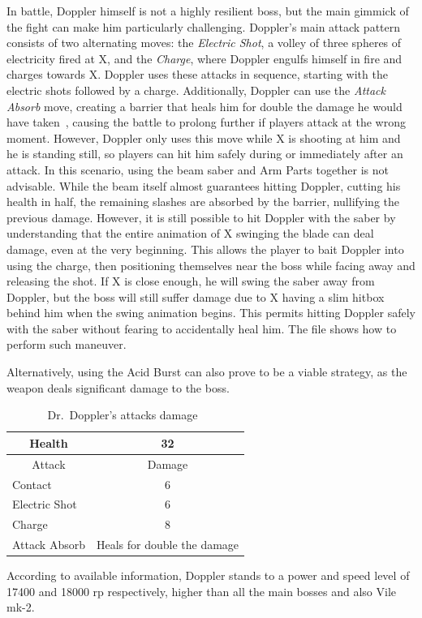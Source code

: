 In battle, Doppler himself is not a highly resilient boss, but the main gimmick of the fight can make him particularly challenging. Doppler's main attack pattern consists of two alternating moves: the \emph{Electric Shot}, a volley of three spheres of electricity fired at X, and the \emph{Charge}, where Doppler engulfs himself in fire and charges towards X. Doppler uses these attacks in sequence, starting with the electric shots followed by a charge. Additionally, Doppler can use the \emph{Attack Absorb} move, creating a barrier that heals him for double the damage he would have taken~\cite{wiki:X3_enemies}, causing the battle to prolong further if players attack at the wrong moment. However, Doppler only uses this move while X is shooting at him and he is standing still, so players can hit him safely during or immediately after an attack. In this scenario, using the beam saber and Arm Parts together is not advisable. While the beam itself almost guarantees hitting Doppler, cutting his health in half, the remaining slashes are absorbed by the barrier, nullifying the previous damage. However, it is still possible to hit Doppler with the saber by understanding that the entire animation of X swinging the blade can deal damage, even at the very beginning. This allows the player to bait Doppler into using the charge, then positioning themselves near the boss while facing away and releasing the shot. If X is close enough, he will swing the saber away from Doppler, but the boss will still suffer damage due to X having a slim hitbox behind him when the swing animation begins. This permits hitting Doppler safely with the saber without fearing to accidentally heal him. The file  shows how to perform such maneuver.

 Alternatively, using the Acid Burst can also prove to be a viable strategy, as the weapon deals significant damage to the boss.
\begin{table}[htp]
	\centering
	\begin{tabular}[h]{l c}
		\toprule
		\multicolumn{1}{c}{Health}  & 32 \\
		\midrule
		\multicolumn{1}{c}{Attack} & \multicolumn{1}{c}{Damage}\\
		Contact & 6 \\
		Electric Shot & 6\\
		Charge & 8\\
		Attack Absorb & Heals for double the damage\\
		\bottomrule
	\end{tabular}
	\caption{Dr.~Doppler's attacks damage~\cite{wiki:Doppler,book:Compendium}}
\end{table}
According to available information, Doppler stands to a power and speed level of 17400 and 18000 rp respectively, higher than all the main bosses and also Vile mk-2.


